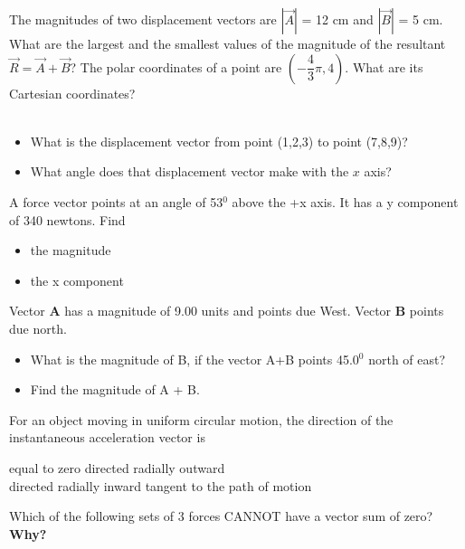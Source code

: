 \documentclass[12pt,addpoints]{exam}
\begin{document}
\begin{questions}
   		\question The magnitudes of two displacement vectors are $|\vec{A}|$ = 12 cm and $|\vec{B}|$ = 5 cm. What are the largest and the smallest values of the magnitude of the resultant  $\vec{R}=\vec{A}+\vec{B}$? \vspace{2cm}
   		\question The polar coordinates of a point are $(-\dfrac{4}{3}\pi,4)$. What are its Cartesian coordinates?\\ \\ \vspace{2cm}
   		\question \begin{itemize}
   			\item What is the displacement vector from point (1,2,3) to point (7,8,9)?\vspace{1in}
   			\item What angle does that displacement vector make with the $x$ axis?\vspace{1in}
   		\end{itemize}
   		\question  A force vector points at an angle of 53$^0$ above the +x axis. It has a y
   		component of 340 newtons. Find 
   		\begin{itemize}
   			\item the magnitude \vspace{1in}
   			\item the x component \vspace{1in}
   		\end{itemize}
   		\question  Vector \textbf{A} has a magnitude of 9.00 units and points due West. Vector \textbf{B} points due north. \begin{itemize}
   			\item What is the magnitude of B, if the vector A+B points 45.0$^0$ north of east?\vspace{1in} 
   			\item Find the magnitude of A + B.\vspace{1in}
   		\end{itemize} 
   		\question For an object moving in uniform circular motion, the direction of the
   		instantaneous acceleration vector is \\
   		\begin{oneparchoices}
   			\choice equal to zero
   			\choice directed radially outward \\
   			\choice directed radially inward
   			\choice tangent to the path of motion
   		\end{oneparchoices}
   		\question Which of the following sets of 3 forces CANNOT have a vector sum of zero? \textbf{Why?} \\

\end{questions}
\end{document}
